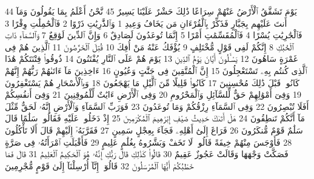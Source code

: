 {\tiny\colorbox{cl_aya}{44}} يَوْمَ تَشَقَّقُ ٱلْأَرْضُ عَنْهُمْ سِرَاعًا ذَٰلِكَ حَشْرٌ عَلَيْنَا يَسِيرٌ
{\tiny\colorbox{cl_aya}{45}} نَّحْنُ أَعْلَمُ بِمَا يَقُولُونَ وَمَآ أَنتَ عَلَيْهِم بِجَبَّارٍ فَذَكِّرْ بِٱلْقُرْءَانِ مَن يَخَافُ وَعِيدِ
{\tiny\colorbox{cl_aya}{1}} وَٱلذَّٰرِيَٰتِ ذَرْوًا
{\tiny\colorbox{cl_aya}{2}} فَٱلْحَٰمِلَٰتِ وِقْرًا
{\tiny\colorbox{cl_aya}{3}} فَٱلْجَٰرِيَٰتِ يُسْرًا
{\tiny\colorbox{cl_aya}{4}} فَٱلْمُقَسِّمَٰتِ أَمْرًا
{\tiny\colorbox{cl_aya}{5}} إِنَّمَا تُوعَدُونَ لَصَادِقٌ
{\tiny\colorbox{cl_aya}{6}} وَإِنَّ ٱلدِّينَ لَوَٰقِعٌ
{\tiny\colorbox{cl_aya}{7}} وَٱلسَّمَآءِ ذَاتِ ٱلْحُبُكِ
{\tiny\colorbox{cl_aya}{8}} إِنَّكُمْ لَفِى قَوْلٍ مُّخْتَلِفٍ
{\tiny\colorbox{cl_aya}{9}} يُؤْفَكُ عَنْهُ مَنْ أُفِكَ
{\tiny\colorbox{cl_aya}{10}} قُتِلَ ٱلْخَرَّٰصُونَ
{\tiny\colorbox{cl_aya}{11}} ٱلَّذِينَ هُمْ فِى غَمْرَةٍ سَاهُونَ
{\tiny\colorbox{cl_aya}{12}} يَسْـَٔلُونَ أَيَّانَ يَوْمُ ٱلدِّينِ
{\tiny\colorbox{cl_aya}{13}} يَوْمَ هُمْ عَلَى ٱلنَّارِ يُفْتَنُونَ
{\tiny\colorbox{cl_aya}{14}} ذُوقُوا۟ فِتْنَتَكُمْ هَٰذَا ٱلَّذِى كُنتُم بِهِۦ تَسْتَعْجِلُونَ
{\tiny\colorbox{cl_aya}{15}} إِنَّ ٱلْمُتَّقِينَ فِى جَنَّٰتٍ وَعُيُونٍ
{\tiny\colorbox{cl_aya}{16}} ءَاخِذِينَ مَآ ءَاتَىٰهُمْ رَبُّهُمْ إِنَّهُمْ كَانُوا۟ قَبْلَ ذَٰلِكَ مُحْسِنِينَ
{\tiny\colorbox{cl_aya}{17}} كَانُوا۟ قَلِيلًا مِّنَ ٱلَّيْلِ مَا يَهْجَعُونَ
{\tiny\colorbox{cl_aya}{18}} وَبِٱلْأَسْحَارِ هُمْ يَسْتَغْفِرُونَ
{\tiny\colorbox{cl_aya}{19}} وَفِىٓ أَمْوَٰلِهِمْ حَقٌّ لِّلسَّآئِلِ وَٱلْمَحْرُومِ
{\tiny\colorbox{cl_aya}{20}} وَفِى ٱلْأَرْضِ ءَايَٰتٌ لِّلْمُوقِنِينَ
{\tiny\colorbox{cl_aya}{21}} وَفِىٓ أَنفُسِكُمْ أَفَلَا تُبْصِرُونَ
{\tiny\colorbox{cl_aya}{22}} وَفِى ٱلسَّمَآءِ رِزْقُكُمْ وَمَا تُوعَدُونَ
{\tiny\colorbox{cl_aya}{23}} فَوَرَبِّ ٱلسَّمَآءِ وَٱلْأَرْضِ إِنَّهُۥ لَحَقٌّ مِّثْلَ مَآ أَنَّكُمْ تَنطِقُونَ
{\tiny\colorbox{cl_aya}{24}} هَلْ أَتَىٰكَ حَدِيثُ ضَيْفِ إِبْرَٰهِيمَ ٱلْمُكْرَمِينَ
{\tiny\colorbox{cl_aya}{25}} إِذْ دَخَلُوا۟ عَلَيْهِ فَقَالُوا۟ سَلَٰمًا قَالَ سَلَٰمٌ قَوْمٌ مُّنكَرُونَ
{\tiny\colorbox{cl_aya}{26}} فَرَاغَ إِلَىٰٓ أَهْلِهِۦ فَجَآءَ بِعِجْلٍ سَمِينٍ
{\tiny\colorbox{cl_aya}{27}} فَقَرَّبَهُۥٓ إِلَيْهِمْ قَالَ أَلَا تَأْكُلُونَ
{\tiny\colorbox{cl_aya}{28}} فَأَوْجَسَ مِنْهُمْ خِيفَةً قَالُوا۟ لَا تَخَفْ وَبَشَّرُوهُ بِغُلَٰمٍ عَلِيمٍ
{\tiny\colorbox{cl_aya}{29}} فَأَقْبَلَتِ ٱمْرَأَتُهُۥ فِى صَرَّةٍ فَصَكَّتْ وَجْهَهَا وَقَالَتْ عَجُوزٌ عَقِيمٌ
{\tiny\colorbox{cl_aya}{30}} قَالُوا۟ كَذَٰلِكِ قَالَ رَبُّكِ إِنَّهُۥ هُوَ ٱلْحَكِيمُ ٱلْعَلِيمُ
{\tiny\colorbox{cl_aya}{31}} قَالَ فَمَا خَطْبُكُمْ أَيُّهَا ٱلْمُرْسَلُونَ
{\tiny\colorbox{cl_aya}{32}} قَالُوٓا۟ إِنَّآ أُرْسِلْنَآ إِلَىٰ قَوْمٍ مُّجْرِمِينَ
